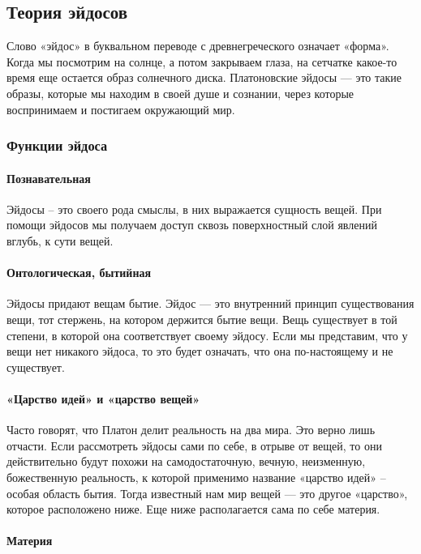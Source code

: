 \documentclass[a4paper, 14pt]{extreport}
\begin{document}
\subsection{Теория эйдосов}

Слово «эйдос» в буквальном переводе с древнегреческого означает «форма».
Когда мы посмотрим на солнце, а потом закрываем глаза, на сетчатке
какое-то время еще остается образ солнечного диска. Платоновские эйдосы
--- это такие образы, которые мы находим в своей душе и сознании, через
которые воспринимаем и постигаем окружающий мир.

\subsubsection{Функции эйдоса}

\paragraph{Познавательная}

Эйдосы -- это своего рода смыслы, в них выражается сущность вещей. При
помощи эйдосов мы получаем доступ сквозь поверхностный слой явлений
вглубь, к сути вещей.

\paragraph{Онтологическая, бытийная}

Эйдосы придают вещам бытие. Эйдос --- это внутренний принцип
существования вещи, тот стержень, на котором держится бытие вещи. Вещь
существует в той степени, в которой она соответствует своему эйдосу.
Если мы представим, что у вещи нет никакого эйдоса, то это будет
означать, что она по-настоящему и не существует.

\paragraph{«Царство идей» и «царство вещей»}

Часто говорят, что Платон делит реальность на два мира. Это верно лишь
отчасти. Если рассмотреть эйдосы сами по себе, в отрыве от вещей, то они
действительно будут похожи на самодостаточную, вечную, неизменную,
божественную реальность, к которой применимо название «царство идей» --
особая область бытия. Тогда известный нам мир вещей --- это другое
«царство», которое расположено ниже. Еще ниже располагается сама по себе
материя.

\paragraph{Материя}
\end{document}
